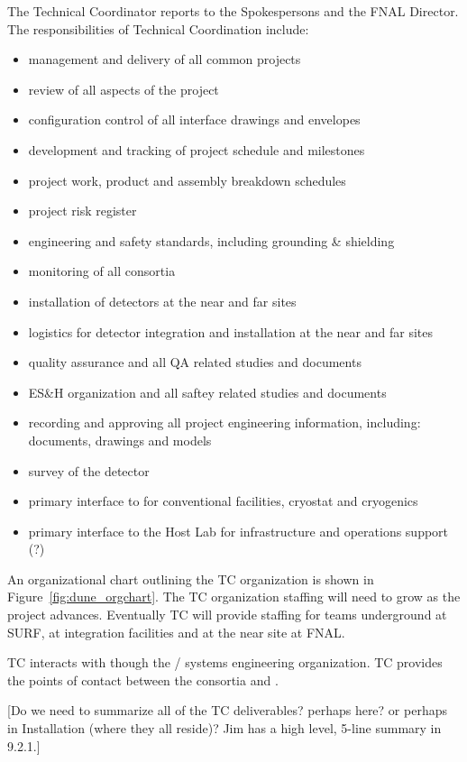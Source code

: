 The  Technical Coordinator reports to the 
Spokespersons and the FNAL Director. The responsibilities of Technical
Coordination include:
\begin{itemize}
  \item management and delivery of all common projects
  \item review of all aspects of the project
  \item configuration control of all interface drawings and envelopes
  \item development and tracking of project schedule and milestones
  \item project work, product and assembly breakdown schedules
  \item project risk register
  \item {} engineering and safety standards, including grounding \& shielding
  \item monitoring of all consortia
  \item installation of detectors at the near and far sites
  \item logistics for detector integration and installation at the near and far sites
  \item quality assurance and all QA related studies and documents
  \item ES\&H organization and all saftey related studies and documents
  \item recording and approving all project engineering information, including: documents, drawings and models
  \item survey of the detector
  \item primary interface to  for conventional facilities, cryostat and cryogenics
  \item primary interface to the Host Lab for infrastructure and operations support (?)
\end {itemize}

An organizational chart outlining the  TC organization is shown in
Figure~\ref{fig:dune_orgchart}. The TC organization staffing will need
to grow as the project advances. Eventually TC will provide staffing
for teams underground at SURF, at integration facilities and at the
near site at FNAL.

 TC interacts with  though the / systems engineering
organization. TC provides the points of contact between the consortia
and .

[Do we need to summarize all of the TC deliverables? perhaps here? or
  perhaps in Installation (where they all reside)? Jim has a high
  level, 5-line summary in 9.2.1.]





